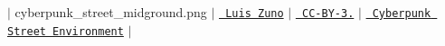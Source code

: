 \texorpdfstring{$\vert$}{|} cyberpunk\+\_\+street\+\_\+midground.\+png \texorpdfstring{$\vert$}{|} \href{http://ansimuz.com/site/}{\texttt{ Luis Zuno}} \texorpdfstring{$\vert$}{|} \href{http://creativecommons.org/licenses/by/3.0/}{\texttt{ CC-\/\+BY-\/3.}} \texorpdfstring{$\vert$}{|} \href{https://ansimuz.itch.io/cyberpunk-street-environment}{\texttt{ Cyberpunk Street Environment}} \texorpdfstring{$\vert$}{|} 